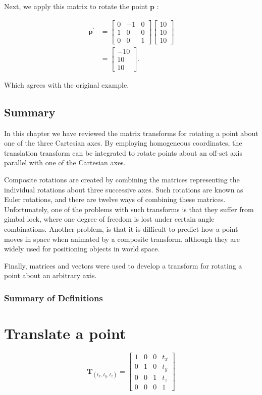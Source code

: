 \documentclass[10pt]{article}
\begin{document}
Next, we apply this matrix to rotate the point $\mathbf{p}$ :

$$
\begin{aligned}
\mathbf{p}^{\prime} & =\left[\begin{array}{ccc}
0 & -1 & 0 \\
1 & 0 & 0 \\
0 & 0 & 1
\end{array}\right]\left[\begin{array}{l}
10 \\
10 \\
10
\end{array}\right] \\
& =\left[\begin{array}{c}
-10 \\
10 \\
10
\end{array}\right] .
\end{aligned}
$$

Which agrees with the original example.

\subsection{Summary}
In this chapter we have reviewed the matrix transforms for rotating a point about one of the three Cartesian axes. By employing homogeneous coordinates, the translation transform can be integrated to rotate points about an off-set axis parallel with one of the Cartesian axes.

Composite rotations are created by combining the matrices representing the individual rotations about three successive axes. Such rotations are known as Euler rotations, and there are twelve ways of combining these matrices. Unfortunately, one of the problems with such transforms is that they suffer from gimbal lock, where one degree of freedom is lost under certain angle combinations. Another problem, is that it is difficult to predict how a point moves in space when animated by a composite transform, although they are widely used for positioning objects in world space.

Finally, matrices and vectors were used to develop a transform for rotating a point about an arbitrary axis.

\subsubsection{Summary of Definitions}
\section{Translate a point}
$$
\mathbf{T}_{\left(t_{x}, t_{y}, t_{z}\right)}=\left[\begin{array}{cccc}
1 & 0 & 0 & t_{x} \\
0 & 1 & 0 & t_{y} \\
0 & 0 & 1 & t_{z} \\
0 & 0 & 0 & 1
\end{array}\right]
$$
\end{document}
